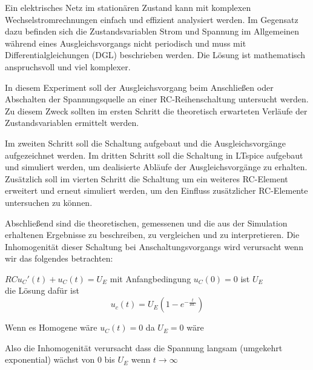 %
Ein elektrisches Netz im stationären Zustand kann mit komplexen Wechselstromrechnungen einfach und effizient analysiert
werden. Im Gegensatz dazu befinden sich die Zustandsvariablen Strom und Spannung im Allgemeinen während eines Ausgleichsvorgangs nicht periodisch und muss mit Differentialgleichungen (DGL) beschrieben werden. Die Lösung ist mathematisch anspruchsvoll und viel komplexer.

In diesem Experiment soll der Ausgleichsvorgang beim Anschließen oder
Abschalten der Spannungsquelle an einer RC-Reihenschaltung untersucht werden. Zu diesem Zweck sollten im ersten Schritt die theoretisch erwarteten Verläufe der Zustandsvariablen ermittelt werden.

Im zweiten Schritt soll die Schaltung aufgebaut und die Ausgleichsvorgänge aufgezeichnet werden. Im dritten Schritt soll die Schaltung in LTspice aufgebaut und simuliert werden, um dealisierte Abläufe der Ausgleichsvorgänge zu erhalten. Zusätzlich soll im vierten Schritt die Schaltung um ein weiteres RC-Element erweitert und erneut simuliert werden, um den Einfluss zusätzlicher RC-Elemente untersuchen zu können.

Abschließend sind die theoretischen, gemessenen und die aus der Simulation erhaltenen Ergebnisse zu beschreiben, zu vergleichen und zu
interpretieren. Die Inhomogenität dieser Schaltung bei Anschaltungsvorgangs wird verursacht wenn wir das folgendes betrachten:

$R C u_C'(t)+u_C(t)=U_E$ mit Anfangbedingung $u_C(0)=0$ ist $U_E$
\\
die Lösung dafür ist \[u_c(t)=U_E( 1-e^{-\frac t{RC}} )\]

Wenn es Homogene wäre 
$u_C(t)=0$ da $U_E=0$ wäre

Also die Inhomogenität verursacht dass die Spannung langsam (umgekehrt exponential) wächst von $0$ bis $U_E$ wenn $t\rightarrow\infty$
%
%
%
\begin{flushright}
  \textit{\autorA}
\end{flushright}
%
%
%